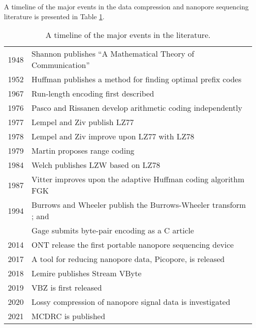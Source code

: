 A timeline of the major events in the data compression and nanopore sequencing literature is presented in Table \ref{tab:lit}.

\begin{table}
\centering
\caption{A timeline of the major events in the literature.}
\label{tab:lit}
\begin{tabular}{r l}
\hline
1948 & Shannon publishes ``A Mathematical Theory of Communication'' \cite{shannon}\\
1952 & Huffman publishes a method for finding optimal prefix codes \cite{huffman}\\
1967 & Run-length encoding first described \cite{rle}\\
1976 & Pasco and Rissanen develop arithmetic coding independently \cite{arithmetic-coding}\\
1977 & Lempel and Ziv publish LZ77 \cite{lz77}\\
1978 & Lempel and Ziv improve upon LZ77 with LZ78 \cite{lz78}\\
1979 & Martin proposes range coding \cite{range-coding}\\
1984 & Welch publishes LZW based on LZ78 \cite{lzw}\\
1987 & Vitter improves upon the adaptive Huffman coding algorithm FGK \cite{vitter}\\
1994 & Burrows and Wheeler publish the Burrows-Wheeler transform \cite{bwt}; and \\
& Gage submits byte-pair encoding as a C article \cite{byte-pair}\\
2014 & ONT release the first portable nanopore sequencing device\\
2017 & A tool for reducing nanopore data, Picopore, is released \cite{picopore}\\
2018 & Lemire publishes Stream VByte \cite{svb}\\
2019 & VBZ is first released\\
2020 & Lossy compression of nanopore signal data is investigated \cite{lossy-nano}\\
2021 & MCDRC is published \cite{mcdrc}\\
\hline
\end{tabular}
\end{table}
